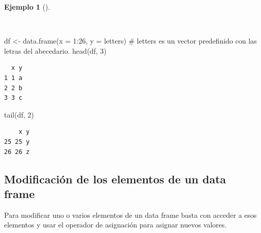 \documentclass[
  a4paper,
]{scrreport}
\newenvironment{Shaded}{\begin{snugshade}}{\end{snugshade}}
\newcommand{\AttributeTok}[1]{\textcolor[rgb]{0.40,0.45,0.13}{#1}}
\newcommand{\CommentTok}[1]{\textcolor[rgb]{0.37,0.37,0.37}{#1}}
\newcommand{\DecValTok}[1]{\textcolor[rgb]{0.68,0.00,0.00}{#1}}
\newcommand{\FunctionTok}[1]{\textcolor[rgb]{0.28,0.35,0.67}{#1}}
\newcommand{\NormalTok}[1]{\textcolor[rgb]{0.00,0.23,0.31}{#1}}
\newcommand{\OtherTok}[1]{\textcolor[rgb]{0.00,0.23,0.31}{#1}}
\newcommand{\SpecialCharTok}[1]{\textcolor[rgb]{0.37,0.37,0.37}{#1}}
\theoremstyle{definition}
\theoremstyle{definition}
\newtheorem{example}{Ejemplo}[chapter]
\theoremstyle{remark}
\begin{document}
\begin{example}[]\protect\hypertarget{exm-acceso-primeras-ultimas-filas-data-frame}{}\label{exm-acceso-primeras-ultimas-filas-data-frame}

~

\begin{Shaded}
\begin{Highlighting}[]
\NormalTok{df }\OtherTok{\textless{}{-}} \FunctionTok{data.frame}\NormalTok{(}\AttributeTok{x =} \DecValTok{1}\SpecialCharTok{:}\DecValTok{26}\NormalTok{, }\AttributeTok{y =}\NormalTok{ letters) }\CommentTok{\# letters es un vector predefinido con las letras del abecedario.}
\FunctionTok{head}\NormalTok{(df, }\DecValTok{3}\NormalTok{)}
\end{Highlighting}
\end{Shaded}

\begin{verbatim}
  x y
1 1 a
2 2 b
3 3 c
\end{verbatim}

\begin{Shaded}
\begin{Highlighting}[]
\FunctionTok{tail}\NormalTok{(df, }\DecValTok{2}\NormalTok{)}
\end{Highlighting}
\end{Shaded}

\begin{verbatim}
    x y
25 25 y
26 26 z
\end{verbatim}

\end{example}

\hypertarget{modificaciuxf3n-de-los-elementos-de-un-data-frame}{%
\subsection{Modificación de los elementos de un data
frame}\label{modificaciuxf3n-de-los-elementos-de-un-data-frame}}

Para modificar uno o varios elementos de un data frame basta con acceder
a esos elementos y usar el operador de asignación para asignar nuevos
valores.
\end{document}
